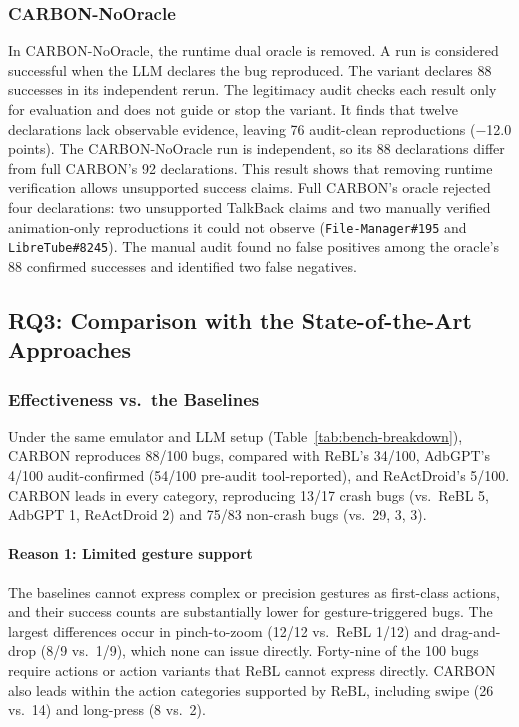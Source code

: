 \documentclass[10pt,conference,a4paper]{IEEEtran}
\begin{document}
  \subsubsection{CARBON-NoOracle}
  In CARBON-NoOracle, the runtime dual oracle is removed. A run is
  considered successful when the LLM declares the bug reproduced. The
  variant declares
  88 successes in its independent rerun. The legitimacy audit checks each
  result only for evaluation and does not guide or stop the variant. It
  finds that twelve declarations lack observable evidence, leaving 76
  audit-clean reproductions ($-$12.0 points). The CARBON-NoOracle run is independent, so its
  88 declarations differ from full CARBON's 92 declarations.
  This result shows that removing runtime verification allows unsupported
  success claims. Full CARBON's oracle rejected four declarations: two
  unsupported TalkBack claims and two manually verified animation-only
  reproductions it could not observe (\texttt{File-Manager\#195} and
  \texttt{LibreTube\#8245}). The manual audit found no false positives among
  the oracle's 88 confirmed successes and identified two false negatives.

  \subsection{RQ3: Comparison with the State-of-the-Art Approaches}
  \label{sec:rq3}

  \subsubsection{Effectiveness vs.\ the Baselines}
  Under the same emulator and LLM setup (Table~\ref{tab:bench-breakdown}),
  CARBON reproduces 88/100 bugs, compared with ReBL's 34/100, AdbGPT's
  4/100 audit-confirmed (54/100 pre-audit tool-reported), and ReActDroid's 5/100.
  CARBON leads in every category, reproducing 13/17 crash bugs
  (vs.\ ReBL 5, AdbGPT 1, ReActDroid 2) and 75/83 non-crash bugs
  (vs.\ 29, 3, 3).

  \paragraph{Reason 1: Limited gesture support}
  The baselines cannot express complex or precision gestures as
  first-class actions, and their success counts are substantially lower for
  gesture-triggered bugs. The largest differences occur in pinch-to-zoom
  (12/12 vs.\ ReBL 1/12) and drag-and-drop
  (8/9 vs.\ 1/9), which none can issue directly. Forty-nine of the 100
  bugs require actions or action variants that ReBL cannot express directly. CARBON also leads within
  the action categories supported by ReBL, including swipe (26 vs.\ 14) and
  long-press (8 vs.\ 2).
\end{document}
